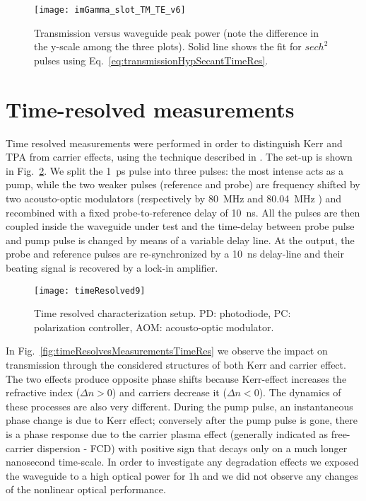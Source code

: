 \begin{figure}[htb]
    \centering
    \texttt{[image: imGamma\_slot\_TM\_TE\_v6]}
     \caption{Transmission versus waveguide peak power (note the difference in the y-scale among the three plots). Solid line shows the fit for $ sech^2 $ pulses using Eq.~\ref{eq:transmissionHypSecantTimeRes}.}
    \label{fig:imGammaSamples}
\end{figure}



\section{Time-resolved measurements}
Time resolved measurements were performed in order to distinguish Kerr and TPA from carrier effects, using the technique described in \cite{Vallaitis2008}.
The set-up is shown in Fig.~\ref{fig:setupTimeResTimeRes}. We split the 1~ps pulse into three pulses: the most intense acts as a pump, while the two weaker pulses (reference and probe) are frequency shifted by two acousto-optic modulators (respectively by 80~MHz and 80.04~MHz ) and recombined with a fixed probe-to-reference delay of 10~ns.
All the pulses are then coupled inside the waveguide under test and the time-delay between probe pulse and pump pulse is changed by means of a variable delay line.
At the output, the probe and reference pulses are re-synchronized by a 10~ns delay-line and their beating signal is recovered by a lock-in amplifier.

                                \begin{figure}[htb]
                                         \centering
                                         \texttt{[image: timeResolved9]}
                                         \caption{Time resolved characterization setup. PD: photodiode, PC: polarization controller, AOM: acousto-optic modulator.}
                                     \label{fig:setupTimeResTimeRes}
                                \end{figure}



In Fig.~\ref{fig:timeResolvesMeasurementsTimeRes} we observe the impact on transmission through the considered structures of both Kerr and carrier effect. The two effects produce opposite phase shifts because Kerr-effect increases the refractive index ($\Delta n > 0 $) and carriers decrease it ($ \Delta n < 0 $).  The dynamics  of these processes are also very different. During the pump pulse, an instantaneous phase change is due to Kerr effect; conversely after the pump pulse is gone, there is a phase response due to the carrier plasma effect (generally indicated as free-carrier dispersion - FCD) with positive sign that decays only on a much longer nanosecond time-scale. In order to investigate any degradation effects we exposed the waveguide to a high optical power for 1h and we did not observe any changes of the nonlinear optical performance.


